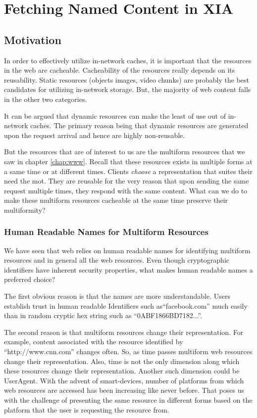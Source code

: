 \chapter{Fetching Named Content in XIA}
\label{chap:namedcontent}

\section{Motivation}

In order to effectively utilize in-network caches, it is important
that the resources in the web are cacheable. Cacheability of the
resources really depends on its reusability. Static resources (objects
images, video chunks) are probably the best candidates for utilizing
in-network storage. But, the majority of web content falls in the
other two categories.

It can be argued that dynamic resources can make the least of use out
of in-network caches. The primary reason being that dynamic resources
are generated upon the request arrival and hence are highly
non-reusable.

But the resources that are of interest to us are the multiform
resources that we saw in chapter \ref{chap:www}. Recall that these
resources exists in multiple forms at a same time or at different
times. Clients \emph{choose} a representation that suites their need
the mot. They are reusable for the very reason that upon sending the
same request multiple times, they respond with the same content. What
can we do to make these multiform resources cacheable at the same time
preserve their multiformity?

\subsection{Human Readable Names for Multiform Resources}

We have seen that web relies on human readable names for identifying
multiform resources and in general all the web resources. Even though
cryptographic identifiers have inherent security properties, what
makes human readable names a preferred choice?

The first obvious reason is that the names are more
understandable. Users establish trust in human readable Identifiers
such as``facebook.com'' much easily than in random cryptic hex string
such as ``0ABF1866BD7182...''.

The second reason is that multiform resources change their
representation. For example, content associated with the resource
identified by ``http://www.cnn.com'' changes often. So, as time passes
multiform web resources change their representation. Also, time is not
the only dimension along which these resources change their
representation. Another such dimension could be UserAgent. With the
advent of smart-devices, number of platforms from which web resources
are accessed has been increasing like never before. That poses us with
the challenge of presenting the same resource in different forms based
on the platform that the user is requesting the resource from.

